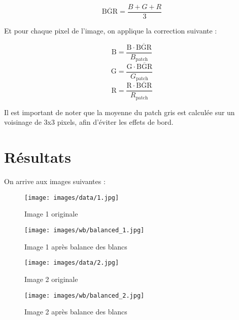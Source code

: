 \documentclass[12pt]{article}
\begin{document}
\begin{equation}
    \overline{\text{BGR}} = \frac{B + G + R}{3}
\end{equation}

Et pour chaque pixel de l'image, on applique la correction suivante :

\begin{equation}
    \text{B} = \frac{\text{B} \cdot \overline{\text{BGR}}}{B_{\text{patch}}}
\end{equation}
\begin{equation}
    \text{G} = \frac{\text{G} \cdot \overline{\text{BGR}}}{G_{\text{patch}}}
\end{equation}
\begin{equation}
    \text{R} = \frac{\text{R} \cdot \overline{\text{BGR}}}{R_{\text{patch}}}
\end{equation}

Il est important de noter que la moyenne du patch gris est calculée sur un voisinage de 3x3 pixels, afin d'éviter les effets de bord.

\clearpage

\section{Résultats}

On arrive aux images suivantes :

\begin{figure}[H]
    \centering
    \begin{minipage}{0.48\textwidth}
        \centering
        \texttt{[image: images/data/1.jpg]}
        \caption{Image 1 originale}
    \end{minipage}
    \hfill
    \begin{minipage}{0.48\textwidth}
        \centering
        \texttt{[image: images/wb/balanced\_1.jpg]}
        \caption{Image 1 après balance des blancs}
    \end{minipage}
\end{figure}

\begin{figure}[H]
    \centering
    \begin{minipage}{0.48\textwidth}
        \centering
        \texttt{[image: images/data/2.jpg]}
        \caption{Image 2 originale}
    \end{minipage}
    \hfill
    \begin{minipage}{0.48\textwidth}
        \centering
        \texttt{[image: images/wb/balanced\_2.jpg]}
        \caption{Image 2 après balance des blancs}
    \end{minipage}
\end{figure}
\end{document}
